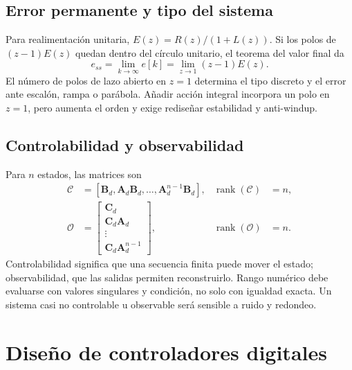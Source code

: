 \documentclass[11pt,letterpaper]{article}
\newcommand{\mat}[1]{\bm{#1}}
\newcommand{\rank}{\operatorname{rank}}
\begin{document}
\subsection{Error permanente y tipo del sistema}
Para realimentación unitaria, $E(z)=R(z)/(1+L(z))$. Si los polos de
$(z-1)E(z)$ quedan dentro del círculo unitario, el teorema del valor final da
\begin{equation}
 e_{ss}=\lim_{k\to\infty}e[k]=\lim_{z\to1}(z-1)E(z).
 \label{eq:finalvalue}
\end{equation}
El número de polos de lazo abierto en $z=1$ determina el tipo discreto y el
error ante escalón, rampa o parábola. Añadir acción integral incorpora un polo
en $z=1$, pero aumenta el orden y exige rediseñar estabilidad y anti-windup.

\subsection{Controlabilidad y observabilidad}
Para $n$ estados, las matrices son
\begin{align}
 \mathcal C&=[\mat B_d,\mat A_d\mat B_d,\ldots,
 \mat A_d^{n-1}\mat B_d],& \rank(\mathcal C)&=n,\label{eq:ctrb}\\
 \mathcal O&=\begin{bmatrix}\mat C_d\\\mat C_d\mat A_d\\\vdots\\
 \mat C_d\mat A_d^{n-1}\end{bmatrix},&\rank(\mathcal O)&=n.
 \label{eq:obsv}
\end{align}
Controlabilidad significa que una secuencia finita puede mover el estado;
observabilidad, que las salidas permiten reconstruirlo. Rango numérico debe
evaluarse con valores singulares y condición, no solo con igualdad exacta. Un
sistema casi no controlable u observable será sensible a ruido y redondeo.

\section{Diseño de controladores digitales}
\end{document}
